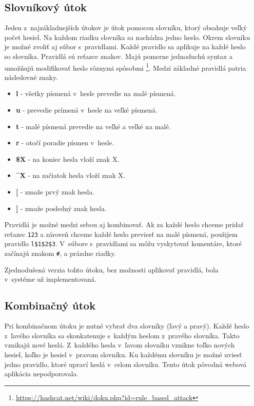 \documentclass[slovak]{fitthesis}
\begin{document}
\subsection{Slovníkový útok} \label{dictAttack}
Jeden z~najzákladnejších útokov je útok pomocou slovníku, ktorý obsahuje veľký počet hesiel. Na každom riadku slovníka sa nachádza jedno heslo. Okrem slovníku je možné zvoliť aj súbor s~pravidlami. Každé pravidlo sa aplikuje na každé heslo so slovníka. Pravidlá sú reťazce znakov. Majú pomerne jednoduchú syntax a umožňujú modifikovať heslo rôznymi spôsobmi \footnote{\url{https://hashcat.net/wiki/doku.php?id=rule_based_attack}}. Medzi základné pravidlá patria následovné znaky.
\begin{itemize}
    \item \textbf{l} - všetky písmená v~hesle prevedie na malé písmená.
    \item \textbf{u} - prevedie prímená v~hesle na veľké písmená.
    \item \textbf{t} - malé písmená prevedie na veľké a veľké na malé.
    \item \textbf{r} - otočí poradie písmen v~hesle.
    \item \textbf{\$X} - na koniec hesla vloží znak X.
    \item \textbf{\^{}X} - na začiatok hesla vloží znak X. 
    \item \textbf{[} - zmaže prvý znak hesla.
    \item \textbf{]} - zmaže posledný znak hesla.
\end{itemize}
Pravidlá je možné medzi sebou aj kombinovať. Ak za každé heslo chceme pridať reťazec \texttt{123} a zároveň chceme každé heslo previesť na malé písmená, použijem pravidlo \texttt{l\$1\$2\$3}. V~súbore s~pravidlami sa môžu vyskytovať komentáre, ktoré začínajú znakom \texttt{\#}, a prázdne riadky.

Zjednodušená verzia tohto útoku, bez možnosti aplikovať pravidlá, bola v~systéme už implementovaná.

\subsection{Kombinačný útok} \label{combAttack}
Pri kombinačnom útoku je nutné vybrať dva slovníky (ľavý a pravý). Každé heslo z~ľavého slovníka sa skonkatenuje s~každým heslom z~pravého slovníka. Takto vznikajú nové heslá. Z~každého hesla v~ľavom slovníku vznikne toľko nových hesiel, koľko je hesiel v~pravom slovníku. Ku každému slovníku je možné uviesť jedno pravidlo, ktoré upraví heslá v~celom slovníku. Tento útok pôvodná webová aplikácia nepodporovala.
\end{document}
